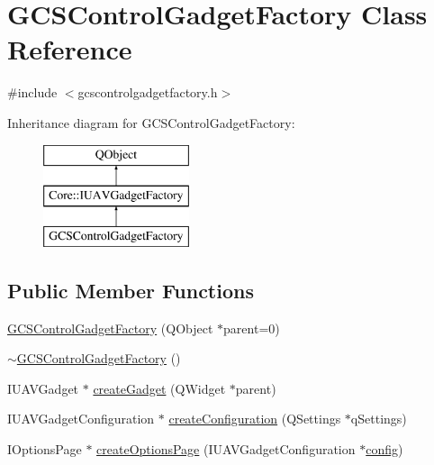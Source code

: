 \hypertarget{class_g_c_s_control_gadget_factory}{\section{G\-C\-S\-Control\-Gadget\-Factory Class Reference}
\label{class_g_c_s_control_gadget_factory}
}


{\ttfamily \#include $<$gcscontrolgadgetfactory.\-h$>$}

Inheritance diagram for G\-C\-S\-Control\-Gadget\-Factory\-:\begin{figure}[H]
\begin{center}
\leavevmode
\includegraphics[height=3.000000cm]{class_g_c_s_control_gadget_factory}
\end{center}
\end{figure}
\subsection*{Public Member Functions}
\begin{DoxyCompactItemize}
\item 
\hyperlink{group___g_c_s_control_gadget_plugin_ga4c54b8d610c379bf28bff1793365f00a}{G\-C\-S\-Control\-Gadget\-Factory} (Q\-Object $\ast$parent=0)
\item 
\hyperlink{group___g_c_s_control_gadget_plugin_ga1e3479dbedd932e780c0413327a44453}{$\sim$\-G\-C\-S\-Control\-Gadget\-Factory} ()
\item 
I\-U\-A\-V\-Gadget $\ast$ \hyperlink{group___g_c_s_control_gadget_plugin_ga36b826b28ef2eea9aef96c03fe2afcb5}{create\-Gadget} (Q\-Widget $\ast$parent)
\item 
I\-U\-A\-V\-Gadget\-Configuration $\ast$ \hyperlink{group___g_c_s_control_gadget_plugin_ga707c9075a9e10d166b1769820e643095}{create\-Configuration} (Q\-Settings $\ast$q\-Settings)
\item 
I\-Options\-Page $\ast$ \hyperlink{group___g_c_s_control_gadget_plugin_gaee4fe12f6708684eb50d0bd348633e8a}{create\-Options\-Page} (I\-U\-A\-V\-Gadget\-Configuration $\ast$\hyperlink{deflate_8c_a4473b5227787415097004fd39f55185e}{config})
\end{DoxyCompactItemize}
